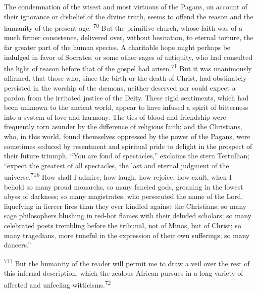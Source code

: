 
The condemnation of the wisest and most virtuous of the Pagans,
on account of their ignorance or disbelief of the divine truth,
seems to offend the reason and the humanity of the present age. \textsuperscript{70}
But the primitive church, whose faith was of a much firmer
consistence, delivered over, without hesitation, to eternal
torture, the far greater part of the human species. A charitable
hope might perhaps be indulged in favor of Socrates, or some
other sages of antiquity, who had consulted the light of reason
before that of the gospel had arisen.\textsuperscript{71} But it was unanimously
affirmed, that those who, since the birth or the death of Christ,
had obstinately persisted in the worship of the dæmons, neither
deserved nor could expect a pardon from the irritated justice of
the Deity. These rigid sentiments, which had been unknown to the
ancient world, appear to have infused a spirit of bitterness into
a system of love and harmony. The ties of blood and friendship
were frequently torn asunder by the difference of religious
faith; and the Christians, who, in this world, found themselves
oppressed by the power of the Pagans, were sometimes seduced by
resentment and spiritual pride to delight in the prospect of
their future triumph. “You are fond of spectacles,” exclaims the
stern Tertullian; “expect the greatest of all spectacles, the
last and eternal judgment of the universe.\textsuperscript{71b} How shall I
admire, how laugh, how rejoice, how exult, when I behold so many
proud monarchs, so many fancied gods, groaning in the lowest
abyss of darkness; so many magistrates, who persecuted the name
of the Lord, liquefying in fiercer fires than they ever kindled
against the Christians; so many sage philosophers blushing in
red-hot flames with their deluded scholars; so many celebrated
poets trembling before the tribunal, not of Minos, but of Christ;
so many tragedians, more tuneful in the expression of their own
sufferings; so many dancers.”

\textsuperscript{711} But the humanity of the reader will permit me to draw a veil
over the rest of this infernal description, which the zealous
African pursues in a long variety of affected and unfeeling
witticisms.\textsuperscript{72}

